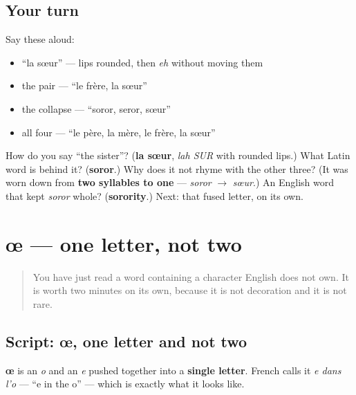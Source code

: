 \subsection*{Your turn}
Say these aloud:

\begin{itemize}
\raggedright
  \item \textquotedblleft{}la sœur\textquotedblright{} — lips rounded, then \emph{eh} without moving them
  \item the pair — \textquotedblleft{}le frère, la sœur\textquotedblright{}
  \item the collapse — \textquotedblleft{}soror, seror, sœur\textquotedblright{}
  \item all four — \textquotedblleft{}le père, la mère, le frère, la sœur\textquotedblright{}
\end{itemize}

\begin{tcolorbox}[breakable,colback=teal!4,colframe=teal!35!black,title={Before you move on}]
How do you say \textquotedblleft{}the sister\textquotedblright{}? (\textbf{la sœur}, \emph{lah SUR} with rounded lips.) What Latin word is behind it? (\textbf{soror}.) Why does it not rhyme with the other three? (It was worn down from \textbf{two syllables to one} — \emph{soror} $\to$ \emph{sœur}.) An English word that kept \emph{soror} whole? (\textbf{sorority}.) Next: that fused letter, on its own.
\end{tcolorbox}
\section[œ]{œ — one letter, not two}

\label{lesson:FR-C10-oe}



\begin{quote}
You have just read a word containing a character English does not own. It is worth two minutes on its own, because it is not decoration and it is not rare.
\end{quote}

\subsection*{Script: œ, one letter and not two}
\textbf{œ} is an \emph{o} and an \emph{e} pushed together into a \textbf{single letter}. French calls it \emph{e dans l'o} — \textquotedblleft{}e in the o\textquotedblright{} — which is exactly what it looks like.

